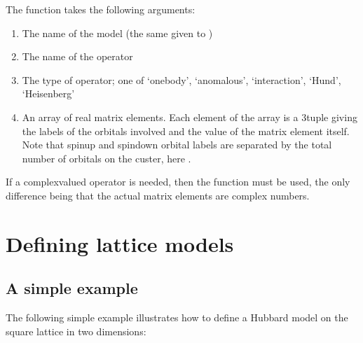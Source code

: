 \documentclass[letterpaper,10pt,english]{sphinxmanual}
\begin{document}
\sphinxAtStartPar
The function  takes the following arguments:
\begin{enumerate}
%
\item {} 
\sphinxAtStartPar
The name of the model (the same given to )

\item {} 
\sphinxAtStartPar
The name of the operator

\item {} 
\sphinxAtStartPar
The type of operator; one of ‘one\sphinxhyphen{}body’, ‘anomalous’, ‘interaction’, ‘Hund’, ‘Heisenberg’

\item {} 
\sphinxAtStartPar
An array of real matrix elements. Each element of the array is a 3\sphinxhyphen{}tuple giving the labels of the orbitals involved and the value of the matrix element itself. Note that spin\sphinxhyphen{}up and spin\sphinxhyphen{}down orbital labels are separated by the total number of orbitals on the custer, here .

\end{enumerate}

\sphinxAtStartPar
If a complex\sphinxhyphen{}valued operator is needed, then the function  must be used, the only difference being that the actual matrix elements are complex numbers.


\section{Defining lattice models}
\label{\detokenize{defining_models:defining-lattice-models}}

\subsection{A simple example}
\label{\detokenize{defining_models:a-simple-example}}
\sphinxAtStartPar
The following simple example illustrates how to define a Hubbard model on the square lattice in two dimensions:
\end{document}
